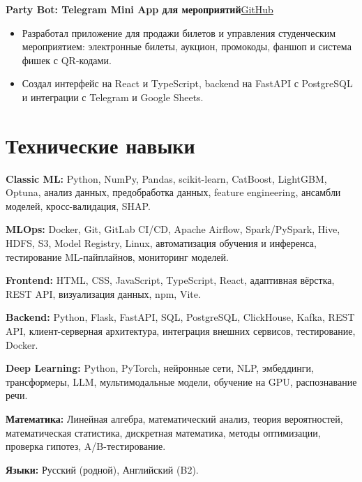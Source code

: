 \documentclass[a4paper,11pt]{article}
\newcommand{\project}[2]{\vspace{6pt}\textbf{#1}\hfill #2\par}
\newcommand{\gh}[1]{\href{#1}{GitHub}}
\begin{document}
\project{Party Bot: Telegram Mini App для мероприятий}{\gh{https://github.com/baranczov/party_bot}}
\begin{itemize}
\item Разработал приложение для продажи билетов и управления студенческим мероприятием: электронные билеты, аукцион, промокоды, фаншоп и система фишек с QR-кодами.
\item Создал интерфейс на React и TypeScript, backend на FastAPI с PostgreSQL и интеграции с Telegram и Google Sheets.
\end{itemize}
\section*{Технические навыки}
\textbf{Classic ML:} Python, NumPy, Pandas, scikit-learn, CatBoost, LightGBM, Optuna, анализ данных, предобработка данных, feature engineering, ансамбли моделей, кросс-валидация, SHAP.\par
\textbf{MLOps:} Docker, Git, GitLab CI/CD, Apache Airflow, Spark/PySpark, Hive, HDFS, S3, Model Registry, Linux, автоматизация обучения и инференса, тестирование ML-пайплайнов, мониторинг моделей.\par
\textbf{Frontend:} HTML, CSS, JavaScript, TypeScript, React, адаптивная вёрстка, REST API, визуализация данных, npm, Vite.\par
\textbf{Backend:} Python, Flask, FastAPI, SQL, PostgreSQL, ClickHouse, Kafka, REST API, клиент-серверная архитектура, интеграция внешних сервисов, тестирование, Docker.\par
\textbf{Deep Learning:} Python, PyTorch, нейронные сети, NLP, эмбеддинги, трансформеры, LLM, мультимодальные модели, обучение на GPU, распознавание речи.\par
\textbf{Математика:} Линейная алгебра, математический анализ, теория вероятностей, математическая статистика, дискретная математика, методы оптимизации, проверка гипотез, A/B-тестирование.\par
\textbf{Языки:} Русский (родной), Английский (B2).
\end{document}
